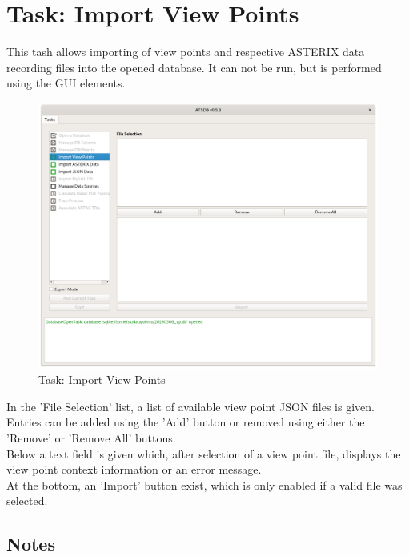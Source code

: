 \section{Task: Import View Points}
\label{sec:task_import_view_points} 

This tash allows importing of view points and respective ASTERIX data recording files into the opened database. It can not be run, but is performed using the GUI elements. \\

\begin{figure}[H]
  \hspace*{-2.5cm}
    \includegraphics[width=19cm]{../screenshots/view_point_import_task.png}
  \caption{Task: Import View Points}
\end{figure}

In the 'File Selection' list, a list of available view point JSON files is given. Entries can be added using the 'Add' button or removed using either the 'Remove' or 'Remove All' buttons. \\

Below a text field is given which, after selection of a view point file, displays the view point context information or an error message. \\

At the bottom, an 'Import' button exist, which is only enabled if a valid file was selected.

\subsection{Notes}

